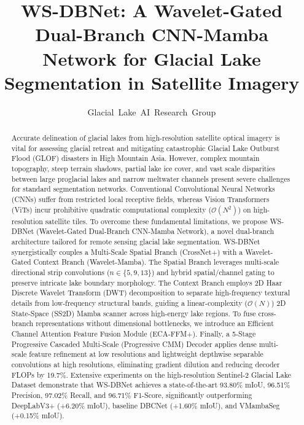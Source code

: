 \documentclass[journal]{IEEEtran}
\begin{document}
\title{WS-DBNet: A Wavelet-Gated Dual-Branch CNN-Mamba Network for Glacial Lake Segmentation in Satellite Imagery}

\author{Glacial~Lake~AI~Research~Group}

\maketitle

\begin{abstract}
Accurate delineation of glacial lakes from high-resolution satellite optical imagery is vital for assessing glacial retreat and mitigating catastrophic Glacial Lake Outburst Flood (GLOF) disasters in High Mountain Asia. However, complex mountain topography, steep terrain shadows, partial lake ice cover, and vast scale disparities between large proglacial lakes and narrow meltwater channels present severe challenges for standard segmentation networks. Conventional Convolutional Neural Networks (CNNs) suffer from restricted local receptive fields, whereas Vision Transformers (ViTs) incur prohibitive quadratic computational complexity ($\mathcal{O}(N^2)$) on high-resolution satellite tiles. To overcome these fundamental limitations, we propose WS-DBNet (Wavelet-Gated Dual-Branch CNN-Mamba Network), a novel dual-branch architecture tailored for remote sensing glacial lake segmentation. WS-DBNet synergistically couples a Multi-Scale Spatial Branch (CrossNet+) with a Wavelet-Gated Context Branch (Wavelet-Mamba). The Spatial Branch leverages multi-scale directional strip convolutions ($n \in \{5, 9, 13\}$) and hybrid spatial/channel gating to preserve intricate lake boundary morphology. The Context Branch employs 2D Haar Discrete Wavelet Transform (DWT) decomposition to separate high-frequency textural details from low-frequency structural bands, guiding a linear-complexity ($\mathcal{O}(N)$) 2D State-Space (SS2D) Mamba scanner across high-energy lake regions. To fuse cross-branch representations without dimensional bottlenecks, we introduce an Efficient Channel Attention Feature Fusion Module (ECA-FFM+). Finally, a 5-Stage Progressive Cascaded Multi-Scale (Progressive CMM) Decoder applies dense multi-scale feature refinement at low resolutions and lightweight depthwise separable convolutions at high resolutions, eliminating gradient dilution and reducing decoder FLOPs by 19.7\%. Extensive experiments on the high-resolution Sentinel-2 Glacial Lake Dataset demonstrate that WS-DBNet achieves a state-of-the-art 93.80\% mIoU, 96.51\% Precision, 97.02\% Recall, and 96.71\% F1-Score, significantly outperforming DeepLabV3+ (+6.20\% mIoU), baseline DBCNet (+1.60\% mIoU), and VMambaSeg (+0.15\% mIoU).
\end{abstract}
\end{document}
